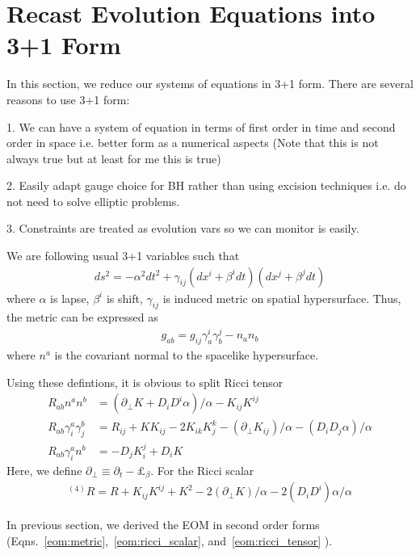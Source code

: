 \documentclass[a4paper,oneside,openany,11pt]{memoir}
\numberwithin{equation}{section} %
\begin{document}
\section{Recast Evolution Equations into 3+1 Form}

In this section, we reduce our systems of equations in 3+1 form. There are several reasons to use 3+1 form:

1. We can have a system of equation in terms of first order in time and second order in space i.e. better form
as a numerical aspects (Note that this is not always true but at least for me this is true)

2. Easily adapt gauge choice for BH rather than using excision techniques i.e. do not need to solve elliptic problems.

3. Constraints are treated as evolution vars so we can monitor is easily.

We are following usual 3+1 variables such that
\begin{align}
\label{eqn:3p1}
ds^2 = -\alpha^2 dt^2 + \gamma_{ij} (dx^i + \beta^i dt)(dx^j + \beta^j dt)
\end{align}
where $\alpha$ is lapse, $\beta^i$ is shift, $\gamma_{ij}$ is induced metric on spatial hypersurface.
Thus, the metric can be expressed as
\begin{align}
g_{ab} = g_{ij}\gamma^i_a \gamma^j_b - n_a n_b
\end{align}
where $n^a$ is the covariant normal to the spacelike hypersurface.

Using these defintions, it is obvious to split Ricci tensor
\begin{align}
\label{ricci3p1}
R_{ab} n^a n^b &= (\partial_\bot K + D_i D^i \alpha)/\alpha - K_{ij} K^{ij} \\
R_{ab} \gamma^a_i \gamma^b_j &= R_{ij} + K K_{ij} - 2 K_{ik} K^{k}_j - (\partial_\bot K_{ij})/\alpha
-(D_i D_j \alpha)/\alpha \\
R_{ab} \gamma^a_i n^b &= - D_j K^j_i + D_i K
\end{align}
Here, we define $\partial_\bot \equiv \partial_t - \pounds_\beta$. For the Ricci scalar
\begin{align}
^{(4)}R = R + K_{ij} K^{ij} + K^2 - 2 (\partial_\bot K) /\alpha - 2 (D_i D^i) \alpha / \alpha
\end{align}

In previous section, we derived the EOM in second order forms 
(Eqns.~\ref{eom:metric},~\ref{eom:ricci_scalar}, and~\ref{eom:ricci_tensor} ).
\end{document}
